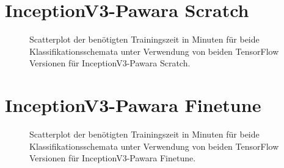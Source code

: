 \section{InceptionV3-Pawara Scratch}
\begin{figure}[H]
\hspace*{-1.5cm}

\caption{Scatterplot der benötigten Trainingszeit in Minuten für beide Klassifikationsschemata unter Verwendung von beiden TensorFlow \cite{tensorflow} Versionen für InceptionV3-Pawara Scratch.}
\label{fig:ScatterplotIPS-dauer}
\end{figure}%
\newpage%
\section{InceptionV3-Pawara Finetune}
\begin{figure}[H]
\hspace*{-1.5cm}

\caption{Scatterplot der benötigten Trainingszeit in Minuten für beide Klassifikationsschemata unter Verwendung von beiden TensorFlow \cite{tensorflow} Versionen für InceptionV3-Pawara Finetune.}
\label{fig:ScatterplotIPF-dauer}
\end{figure}%
\newpage\null\newpage%